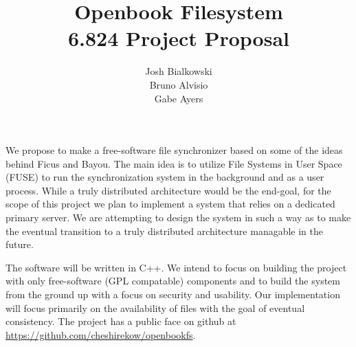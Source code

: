 \documentclass{article}
\title
{%
   Openbook Filesystem \\
   \small 6.824 Project Proposal
}
\author
{%
   \small Josh Bialkowski \\
   \small Bruno Alvisio \\
   \small Gabe Ayers 
}
\begin{document}
\maketitle

We propose to make a free-software file synchronizer based on some of the ideas 
behind Ficus and Bayou. The main idea is to utilize File Systems in User Space
(FUSE) to run the synchronization system in the background and as a user 
process. While a truly distributed architecture would be the end-goal, for the
scope of this project we plan to implement a system that relies on a dedicated
primary server. We are attempting to design the system in such a way as to make
the eventual transition to a truly distributed architecture managable in the
future. 

The software will be written in C++. We intend to focus on building the project
with only free-software (GPL compatable) components and to build the system 
from the ground up with a focus on security and usability. Our implementation 
will focus primarily on the availability of files with the goal of eventual
consistency. The project has a public face on github at 
\url{https://github.com/cheshirekow/openbookfs}. 
\end{document}
